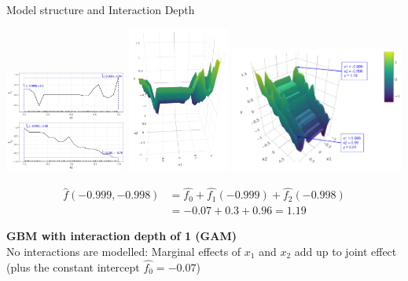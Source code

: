 \begin{vbframe}{Model structure and Interaction Depth}
\begin{center}
\includegraphics[width=0.3\textwidth]{figure_man/boosting_interaction_example_gam.png}
\includegraphics[width=0.25\textwidth]{figure_man/boosting_interaction_depth1fit3D_x1.png}
\includegraphics[width=0.43\textwidth]{figure/interaction_td1_d3.png}
\end{center}
\begin{align*}
\hat{f}(-0.999,-0.998) &= \hat{f_0} + \hat{f_1}(-0.999) + \hat{f_2}(-0.998)\\ 
&= -0.07 + 0.3 + 0.96 = 1.19
\end{align*}

\framebreak

\textbf{GBM with interaction depth of 1 (GAM)}\\
No interactions are modelled: Marginal effects of $x_1$ and $x_2$ add up to joint effect (plus the constant intercept $\hat{f_0} = -0.07$)


\end{vbframe}

